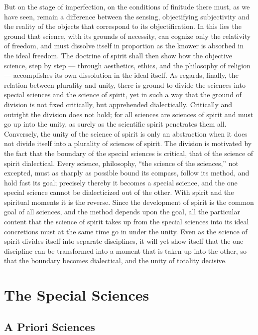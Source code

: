 \documentclass[12pt]{book}
\begin{document}
But on the stage of imperfection, on the conditions of finitude there must, as we
have seen, remain a difference between the sensing, objectifying subjectivity and
the reality of the objects that correspond to its objectification. In this lies
the ground that science, with its grounds of necessity, can cognize only the
relativity of freedom, and must dissolve itself in proportion as the knower is
absorbed in the ideal freedom. The doctrine of spirit shall then show how the
objective science, step by step --- through aesthetics, ethics, and the
philosophy of religion --- accomplishes its own dissolution in the ideal itself.
As regards, finally, the relation between plurality and unity, there is ground to
divide the sciences into special sciences and the science of spirit, yet in such
a way that the ground of division is not fixed critically, but apprehended
dialectically. Critically and outright the division does not hold; for all
sciences are sciences of spirit and must go up into the unity, as surely as the
scientific spirit penetrates them all. Conversely, the unity of the science of
spirit is only an abstraction when it does not divide itself into a plurality of
sciences of spirit. The division is motivated by the fact that the boundary of
the special sciences is critical, that of the science of spirit dialectical.
Every science, philosophy, ``the science of the sciences,'' not excepted, must as
sharply as possible bound its compass, follow its method, and hold fast its goal;
precisely thereby it becomes a special science, and the one special science
cannot be dialecticized out of the other. With spirit and the spiritual moments
it is the reverse. Since the development of spirit is the common goal of all
sciences, and the method depends upon the goal, all the particular content that
the science of spirit takes up from the special sciences into its ideal
concretions must at the same time go in under the unity. Even as the science of
spirit divides itself into separate disciplines, it will yet show itself that the
one discipline can be transformed into a moment that is taken up into the other,
so that the boundary becomes dialectical, and the unity of totality decisive.


\part{The Special Sciences}

\chapter{A Priori Sciences}
\end{document}
